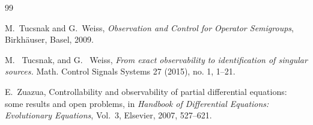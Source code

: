 \documentclass[11pt,a4paper]{article}
\numberwithin{equation}{section}
\begin{document}
\begin{thebibliography}{99}


M.~Tucsnak and G.~Weiss,
\emph{Observation and Control for Operator Semigroups},
Birkhäuser, Basel, 2009.


M. ~Tucsnak, and G.~ Weiss,
 \emph{From exact observability to identification of singular sources.} 
Math. Control Signals Systems 27 (2015), no. 1, 1–21.


E.~Zuazua,
Controllability and observability of partial differential equations: some results and open problems,
in \emph{Handbook of Differential Equations: Evolutionary Equations}, Vol.~3, Elsevier, 2007, 527--621.



\end{thebibliography}
\end{document}
